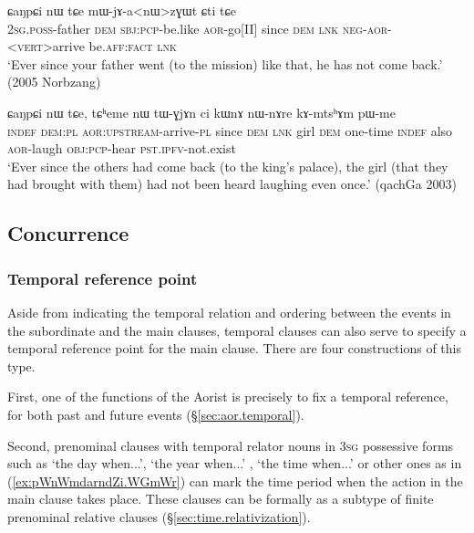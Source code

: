 \begin{exe}
\ex \label{ex:jari.CaNpCi} 
 ɕaŋpɕi nɯ tɕe mɯ-jɤ-a<nɯ>zɣɯt ɕti tɕe \\
\textsc{2sg}.\textsc{poss}-father \textsc{dem} \textsc{sbj}:\textsc{pcp}-be.like \textsc{aor}-go[II] since \textsc{dem} \textsc{lnk} \textsc{neg}-\textsc{aor}-<\textsc{vert}>arrive be.\textsc{aff}:\textsc{fact} \textsc{lnk} \\
\glt `Ever since your father went (to the mission) like that, he has not come back.' (2005 Norbzang)
\end{exe}  

\begin{exe}
\ex \label{ex:lazGWtnW.CaNpCi} 
 ɕaŋpɕi nɯ tɕe, tɕʰeme nɯ tɯ-ɣjɤn ci kɯnɤ nɯ-nɤre kɤ-mtsʰɤm pɯ-me \\
\textsc{indef} \textsc{dem}:\textsc{pl} \textsc{aor}:\textsc{upstream}-arrive-\textsc{pl} since \textsc{dem} \textsc{lnk} girl \textsc{dem} one-time \textsc{indef} also \textsc{aor}-laugh \textsc{obj}:\textsc{pcp}-hear \textsc{pst}.\textsc{ipfv}-not.exist \\
\glt `Ever since the others had come back (to the king's palace), the girl (that they had brought with them) had not been heard laughing even once.' (qachGa 2003)
\end{exe}  

 
\subsection{Concurrence}

\subsubsection{Temporal reference point} \label{sec:temporal.reference}
Aside from indicating the temporal relation and ordering between the events in the subordinate and the main clauses, temporal clauses can also serve to specify a temporal reference point for the main clause. There are four constructions of this type.

First, one of the functions of the Aorist is precisely to fix a temporal reference, for both past and future events (§\ref{sec:aor.temporal}). 

Second, prenominal clauses with temporal relator nouns in \textsc{3sg} possessive forms such as   `the day when...',  `the year when...' ,  `the time when...' or other ones as in (\ref{ex:pWnWmdarndZi.WGmWr}) can mark the time period when the action in the main clause takes place. These  clauses can be formally as a subtype of finite prenominal relative clauses (§\ref{sec:time.relativization}).
 
